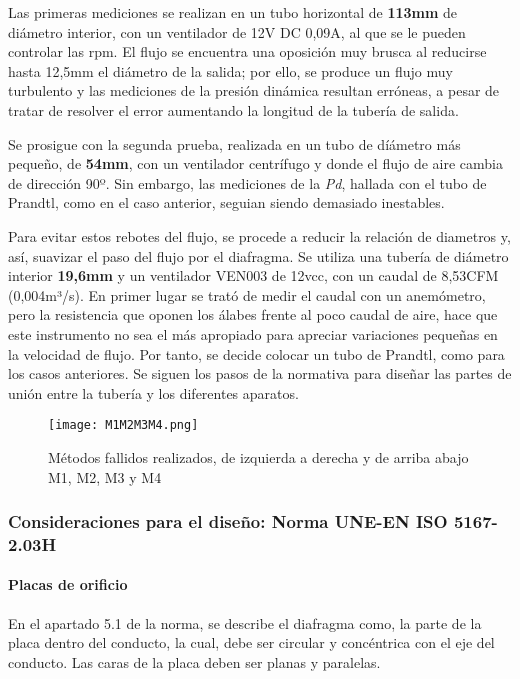 Las primeras mediciones se realizan en un tubo horizontal de
\textbf{113mm} de diámetro interior, con un ventilador de 12V DC 0,09A,
al que se le pueden controlar las rpm. El flujo se encuentra una
oposición muy brusca al reducirse hasta 12,5mm el diámetro de la salida;
por ello, se produce un flujo muy turbulento y las mediciones de la
presión dinámica resultan erróneas, a pesar de tratar de resolver el
error aumentando la longitud de la tubería de salida.

Se prosigue con la segunda prueba, realizada en un tubo de díámetro más
pequeño, de \textbf{54mm}, con un ventilador centrífugo y donde el flujo
de aire cambia de dirección 90º. Sin embargo, las mediciones de la
\emph{Pd}, hallada con el tubo de Prandtl, como en el caso anterior,
seguian siendo demasiado inestables.

Para evitar estos rebotes del flujo, se procede a reducir la relación de
diametros y, así, suavizar el paso del flujo por el diafragma. Se
utiliza una tubería de diámetro interior \textbf{19,6mm} y un ventilador
VEN003 de 12vcc, con un caudal de 8,53CFM (0,004m³/s). En primer lugar
se trató de medir el caudal con un anemómetro, pero la resistencia que
oponen los álabes frente al poco caudal de aire, hace que este
instrumento no sea el más apropiado para apreciar variaciones pequeñas
en la velocidad de flujo. Por tanto, se decide colocar un tubo de
Prandtl, como para los casos anteriores. Se siguen los pasos de la
normativa para diseñar las partes de unión entre la tubería y los
diferentes aparatos.

\begin{figure}
\centering
\texttt{[image: M1M2M3M4.png]}
\caption[Métodos fallidos realizados]{Métodos fallidos realizados, de izquierda a derecha y de arriba abajo M1, M2, M3 y M4}
\label{fig:M1M2M3M4}
\end{figure}

\subsubsection{Consideraciones para el diseño: Norma UNE-EN ISO 5167-2.03H}\label{header-n277}

\paragraph{Placas de orificio}\label{header-n278}

En el apartado 5.1 de la norma, se describe el diafragma como, la parte
de la placa dentro del conducto, la cual, debe ser circular y
concéntrica con el eje del conducto. Las caras de la placa deben ser
planas y paralelas.

